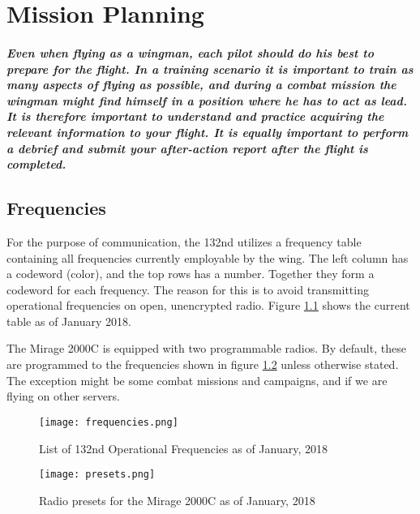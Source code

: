\chapter{Mission Planning}
  \paragraph{
  		Even when flying as a wingman, each pilot should do his best to prepare for the flight. In a training scenario it is important to train as many aspects of flying as possible, and during a combat mission the wingman might find himself in a position where he has to act as lead. It is therefore important to understand and practice acquiring the relevant information to your flight. It is equally important to perform a debrief and submit your after-action report after the flight is completed. \\
  }
  
\section{Frequencies}
  \textnormal{
  	For the purpose of communication, the 132nd utilizes a frequency table containing all frequencies currently employable by the wing. The left column has a codeword (color), and the top rows has a number. Together they form a codeword for each frequency. The reason for this is to avoid transmitting operational frequencies on open, unencrypted radio. Figure \ref{opfreqs} shows the current table as of January 2018. \\
  }
  
  \textnormal{
  	The Mirage 2000C is equipped with two programmable radios. By default, these are programmed to the frequencies shown in figure \ref{presets} unless otherwise stated. The exception might be some combat missions and campaigns, and if we are flying on other servers. \\
  }
  
  \begin{figure}[!ht]
  	\texttt{[image: frequencies.png]}
    	\label{opfreqs}
    	\caption{List of 132nd Operational Frequencies as of January, 2018}
  \end{figure}
  
  \begin{figure}[!ht]
  	\texttt{[image: presets.png]}
    	\label{presets}
    	\caption{Radio presets for the Mirage 2000C as of January, 2018}
  \end{figure}


